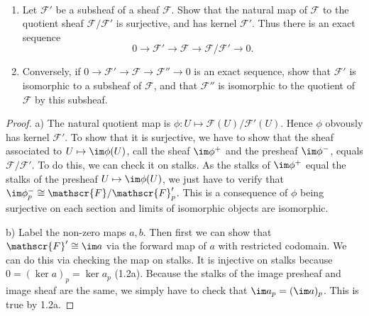 \begin{exercise}%
	~
	\begin{enumerate}
		\item Let $\mathscr{F}' $ be a subsheaf of a sheaf $\mathscr{F} $. Show that the natural map of $\mathscr{F} $ to the quotient sheaf $\mathscr{F} / \mathscr{F}' $ is surjective, and has kernel $\mathscr{F}' $. Thus there is an exact sequence
		\[
			0 \to \mathscr{F}' \to \mathscr{F} \to \mathscr{F} / \mathscr{F}' \to 0
		.\]
		\item Conversely, if $0 \to \mathscr{F}' \to \mathscr{F} \to \mathscr{F}''\to 0 $ is an exact sequence, show that $\mathscr{F}' $ is isomorphic to a subsheaf of $\mathscr{F} $, and that $\mathscr{F}'' $ is isomorphic to the quotient of $\mathscr{F} $ by this subsheaf.
	\end{enumerate}
\end{exercise}
\begin{proof}
	a)
	The natural quotient map is $\phi: U \mapsto \mathscr{F}(U) / \mathscr{F}'(U)$.
	Hence $\phi$ obvously has kernel $\mathscr{F}' $.
	To show that it is surjective, we have to show that the sheaf associated to $U\mapsto \im \phi(U) $, call the sheaf $\im \phi^+ $ and the presheaf $\im \phi^- $, equals $\mathscr{F} / \mathscr{F}' $.
	To do this, we can check it on stalks.
	As the stalks of $\im \phi^+ $ equal the stalks of the presheaf $U\mapsto \im \phi(U) $, we just have to verify that $\im \phi^-_p \cong \mathscr{F} / \mathscr{F}'_p$.
	This is a consequence of $\phi $ being surjective on each section and limits of isomorphic objects are isomorphic.

	b)
	Label the non-zero maps $a,b $.
	Then first we can show that $\mathscr{F}' \cong \im a $ via the forward map of $a $ with restricted codomain.
	We can do this via checking the map on stalks.
	It is injective on stalks because $0 = (\ker a)_p = \ker a_p$ (1.2a).
	Because the stalks of the image presheaf and image sheaf are the same, we simply have to check that $\im a_p = (\im a)_p $.
	This is true by 1.2a.
\end{proof}

